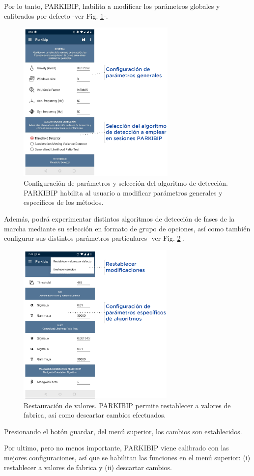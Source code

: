 Por lo tanto, PARKIBIP, habilita a modificar los parámetros globales y calibrados por defecto -ver Fig. \ref{fig:manual-config}-. 

\newpage

\begin{figure}[H]
 \centering
 \includegraphics[height=8cm]{TESIS/imagenes/user-manual/manual-config.PNG}
 \caption{Configuración de parámetros y selección del algoritmo de detección. PARKIBIP habilita al usuario a modificar parámetros generales y específicos de los métodos.}
 \label{fig:manual-config}
\end{figure}

Además, podrá experimentar distintos algoritmos de detección de fases de la marcha mediante su selección en formato de grupo de opciones, así como también configurar sus distintos parámetros particulares -ver Fig. \ref{fig:manual-config2}-. 
\begin{figure}[H]
 \centering
 \includegraphics[height=8cm]{TESIS/imagenes/user-manual/manual-config2.PNG}
 \caption{Restauración de valores. PARKIBIP permite restablecer a valores de fabrica, así como descartar cambios efectuados.}
 \label{fig:manual-config2}
\end{figure}

Presionando el botón guardar, del menú superior, los cambios son establecidos.

Por ultimo, pero no menos importante, PARKIBIP viene calibrado con las mejores configuraciones, así que se habilitan las funciones en el menú superior: (i) restablecer a valores de fabrica y (ii) descartar cambios.
